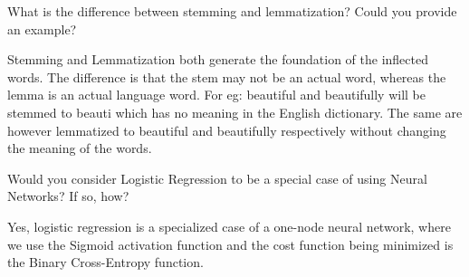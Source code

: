 	\begin{qanda}
		\begin{question}
What is the difference between stemming and lemmatization? Could you provide an example?
		\end{question}
		\begin{answer}
Stemming and Lemmatization both generate the foundation of the inflected words. The difference is that the stem may not be an actual word, whereas the lemma is an actual language word. For eg: beautiful and beautifully will be stemmed to beauti which has no meaning in the English dictionary. The same are however lemmatized to beautiful and beautifully respectively without changing the meaning of the words.
		\end{answer}
	\end{qanda}

	\begin{qanda}
		\begin{question}
Would you consider Logistic Regression to be a special case of using Neural Networks? If so, how?
		\end{question}
		\begin{answer}
Yes, logistic regression is a specialized case of a one-node neural network, where we use the Sigmoid activation function and the cost function being minimized is the Binary Cross-Entropy function.
		\end{answer}
	\end{qanda} 